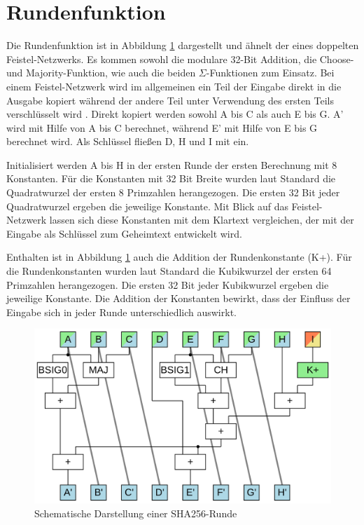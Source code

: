 \section{Rundenfunktion}
\label{sec:sha256:runde}

Die Rundenfunktion ist in Abbildung \ref{fig:sha256core} dargestellt und ähnelt der eines doppelten Feistel-Netzwerks.
Es kommen sowohl die modulare 32-Bit Addition, die Choose- und Majority-Funktion, wie auch die beiden $\Sigma$-Funktionen zum Einsatz.
Bei einem Feistel-Netzwerk wird im allgemeinen ein Teil der Eingabe direkt in die Ausgabe kopiert während der andere
Teil unter Verwendung des ersten Teils verschlüsselt wird \cite[311]{crypto1}. Direkt kopiert werden sowohl A bis C
als auch E bis G. A' wird mit Hilfe von A bis C berechnet, während E' mit Hilfe von E bis G berechnet wird.
Als Schlüssel fließen D, H und I mit ein.

Initialisiert werden A bis H in der ersten Runde der ersten Berechnung mit 8 Konstanten. Für die Konstanten mit 32 Bit Breite wurden laut
Standard \cite[10]{nist1804} die Quadratwurzel der ersten 8 Primzahlen herangezogen. Die ersten 32 Bit jeder Quadratwurzel ergeben die jeweilige Konstante.
Mit Blick auf das Feistel-Netzwerk lassen sich diese Konstanten mit dem Klartext vergleichen, der mit der Eingabe als Schlüssel zum Geheimtext
entwickelt wird.

Enthalten ist in Abbildung \ref{fig:sha256core} auch die Addition der Rundenkonstante (K+). Für die Rundenkonstanten wurden laut Standard
\cite[10]{nist1804} die Kubikwurzel der ersten 64 Primzahlen herangezogen. Die ersten 32 Bit jeder Kubikwurzel ergeben die jeweilige Konstante.
Die Addition der Konstanten bewirkt, dass der Einfluss der Eingabe sich in jeder Runde unterschiedlich auswirkt.

\begin{figure}[!h]
  \centering
  \includegraphics[scale=0.4]{images/sha256core}
  \caption{Schematische Darstellung einer SHA256-Runde}
  \label{fig:sha256core}
\end{figure}